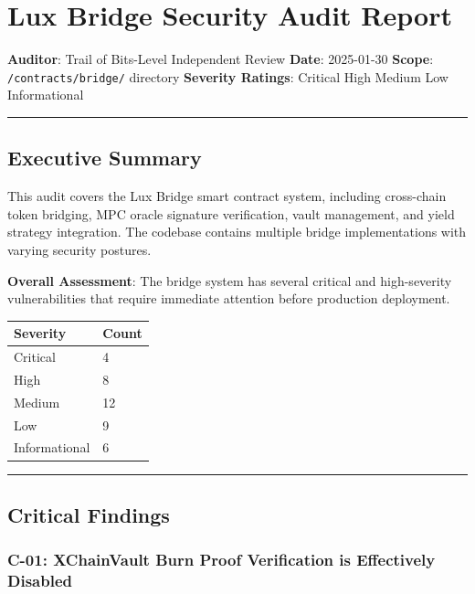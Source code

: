 \documentclass[
]{article}
\author{}
\date{}
\newcounter{none} %
\begin{document}
\section{Lux Bridge Security Audit
Report}\label{lux-bridge-security-audit-report}

\textbf{Auditor}: Trail of Bits-Level Independent Review \textbf{Date}:
2025-01-30 \textbf{Scope}: \texttt{/contracts/bridge/} directory
\textbf{Severity Ratings}: Critical \textbar{} High \textbar{} Medium
\textbar{} Low \textbar{} Informational

\begin{center}\rule{0.5\linewidth}{0.5pt}\end{center}

\subsection{Executive Summary}\label{executive-summary}

This audit covers the Lux Bridge smart contract system, including
cross-chain token bridging, MPC oracle signature verification, vault
management, and yield strategy integration. The codebase contains
multiple bridge implementations with varying security postures.

\textbf{Overall Assessment}: The bridge system has several critical and
high-severity vulnerabilities that require immediate attention before
production deployment.

{\def\LTcaptype{none} %
\begin{longtable}[]{@{}ll@{}}
\toprule\noalign{}
Severity & Count \\
\midrule\noalign{}
\endhead
\bottomrule\noalign{}
\endlastfoot
Critical & 4 \\
High & 8 \\
Medium & 12 \\
Low & 9 \\
Informational & 6 \\
\end{longtable}
}

\begin{center}\rule{0.5\linewidth}{0.5pt}\end{center}

\subsection{Critical Findings}\label{critical-findings}

\subsubsection{C-01: XChainVault Burn Proof Verification is Effectively
Disabled}\label{c-01-xchainvault-burn-proof-verification-is-effectively-disabled}
\end{document}
